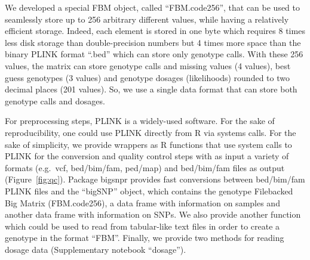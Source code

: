 \documentclass{bioinfo}
\begin{document}
\begin{methods}
{\color{red}
We developed a special FBM object, called ``FBM.code256'', that can be used to seamlessly store up to 256 arbitrary different values, while having a relatively efficient storage. Indeed, each element is stored in one byte which requires 8 times less disk storage than double-precision numbers but 4 times more space than the binary PLINK format ``.bed'' which can store only genotype calls. With these 256 values, the matrix can store genotype calls and missing values (4 values), best guess genotypes (3 values) and genotype dosages (likelihoods) rounded to two decimal places (201 values). So, we use a single data format that can store both genotype calls and dosages.

For preprocessing steps, PLINK is a widely-used software. For the sake of reproducibility, one could use PLINK directly from R via systems calls. For the sake of simplicity, we provide wrappers as R functions that use system calls to PLINK for the conversion and quality control steps with as input a variety of formats (e.g.\ vcf, bed/bim/fam, ped/map) and bed/bim/fam files as output (Figure~\ref{fig:qc}).
Package bigsnpr provides fast conversions between bed/bim/fam PLINK files and the ``bigSNP'' object, which contains the genotype Filebacked Big Matrix (FBM.code256), a data frame with information on samples and another data frame with information on SNPs. We also provide another function which could be used to read from tabular-like text files in order to create a genotype in the format ``FBM''. Finally, we provide two methods for reading dosage data (Supplementary notebook ``dosage'').

}
\end{methods}
\end{document}
